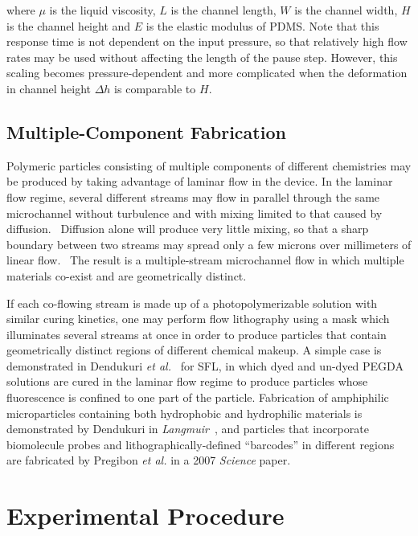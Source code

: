 where $\mu$ is the liquid viscosity,
$L$ is the channel length, $W$ is the channel width, $H$ is the channel height and $E$ is the elastic
modulus of PDMS.  Note that this response time is not dependent on the input pressure, so that relatively high
flow rates may be used without affecting the length of the pause step. However, this scaling becomes pressure-dependent
and more complicated when the deformation in channel height $\Delta h$ is comparable to $H$.~\cite{dendukuri-sfl}

\subsection{Multiple-Component Fabrication}

Polymeric particles consisting of multiple components of different chemistries may be produced by taking advantage
of laminar flow in the device.  
In the laminar flow regime, several different streams may flow in parallel through
the same microchannel without turbulence and with mixing limited to that caused by 
diffusion.~\cite{stone-laminar}  Diffusion alone
will produce very little mixing, so that a sharp boundary between two streams may spread only a few microns over
millimeters of linear flow.~\cite{mohr-flow} The result is a multiple-stream microchannel flow in which multiple materials
co-exist and are geometrically distinct.

If each co-flowing stream is made up of a photopolymerizable solution with similar curing kinetics, one may perform
flow lithography using a mask which illuminates several streams at once in order
to produce particles that contain geometrically
distinct regions of different chemical makeup.  A simple case 
is demonstrated in Dendukuri \textit{et al.}~\cite{dendukuri-sfl}
for SFL, in which dyed and un-dyed PEGDA solutions are cured in the laminar flow regime to produce particles whose
fluorescence is confined to one part of the particle.  Fabrication of amphiphilic microparticles containing both
hydrophobic and hydrophilic materials is demonstrated by Dendukuri in 
\textit{Langmuir}~\cite{dendukuri-amph}, and particles that incorporate biomolecule probes and lithographically-defined
``barcodes'' in different regions are fabricated by Pregibon \textit{et al.} in a 2007 
\textit{Science} paper.~\cite{pregibon-dna}

\section{Experimental Procedure}
\label{sec:rods-exp}

